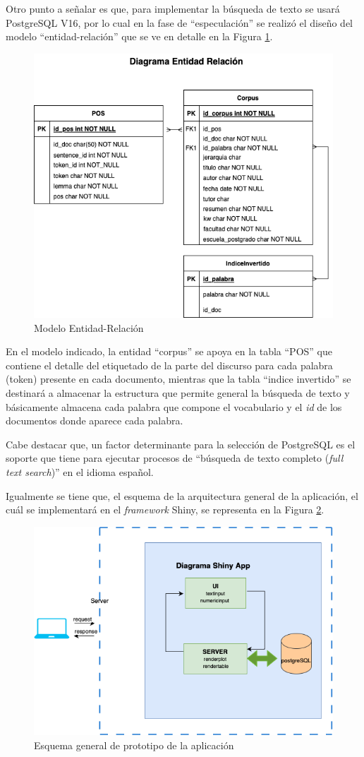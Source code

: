 \documentclass[
  12pt,
  openany]{book}
\begin{document}
Otro punto a señalar es que, para implementar la búsqueda de texto se usará PostgreSQL V16, por lo cual en la fase de ``especulación'' se realizó el diseño del modelo ``entidad-relación'' que se ve en detalle en la Figura \ref{fig:entrel}.

\begin{figure}

{\centering \includegraphics[width=0.6\linewidth]{images/05-desarrollo/2_ciclo/esquemas/diagrama_entidadrel} 

}

\caption{Modelo Entidad-Relación}\label{fig:entrel}
\end{figure}

En el modelo indicado, la entidad ``corpus'' se apoya en la tabla ``POS'' que contiene el detalle del etiquetado de la parte del discurso para cada palabra (token) presente en cada documento, mientras que la tabla ``indice invertido'' se destinará a almacenar la estructura que permite general la búsqueda de texto y básicamente almacena cada palabra que compone el vocabulario y el \emph{id} de los documentos donde aparece cada palabra.

Cabe destacar que, un factor determinante para la selección de PostgreSQL es el soporte que tiene para ejecutar procesos de ``búsqueda de texto completo (\emph{full text search})'' en el idioma español.

Igualmente se tiene que, el esquema de la arquitectura general de la aplicación, el cuál se implementará en el \emph{framework} Shiny, se representa en la Figura \ref{fig:esqshinyproto}.

\begin{figure}

{\centering \includegraphics[width=0.5\linewidth]{images/05-desarrollo/2_ciclo/esquemas/shinyappproto} 

}

\caption{Esquema general de prototipo de la aplicación}\label{fig:esqshinyproto}
\end{figure}
\end{document}
